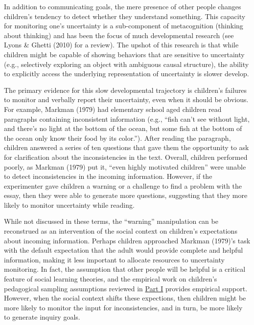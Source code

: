 \documentclass[oneside]{report}
\begin{document}
In addition to communicating goals, the mere presence of other people
changes children's tendency to detect whether they understand something.
This capacity for monitoring one's uncertainty is a sub-component of
metacognition (thinking about thinking) and has been the focus of much
developmental research (see Lyons \& Ghetti (2010) for a review). The
upshot of this research is that while children might be capable of
showing behaviors that are sensitive to uncertainty (e.g., selectively
exploring an object with ambiguous causal structure), the ability to
explicitly access the underlying representation of uncertainty is slower
develop.

The primary evidence for this slow developmental trajectory is
children's failures to monitor and verbally report their uncertainty,
even when it should be obvious. For example, Markman (1979) had
elementary school aged children read paragraphs containing inconsistent
information (e.g., ``fish can't see without light, and there's no light
at the bottom of the ocean, but some fish at the bottom of the ocean
only know their food by its color.''). After reading the paragraph,
children answered a series of ten questions that gave them the
opportunity to ask for clarification about the inconsistencies in the
text. Overall, children performed poorly, as Markman (1979) put it,
``even highly motivated children'' were unable to detect inconsistencies
in the incoming information. However, if the experimenter gave children
a warning or a challenge to find a problem with the essay, then they
were able to generate more questions, suggesting that they more likely
to monitor uncertainty while reading.

While not discussed in these terms, the ``warning'' manipulation can be
reconstrued as an intervention of the social context on children's
expectations about incoming information. Perhaps children approached
Markman (1979)'s task with the default expectation that the adult would
provide complete and helpful information, making it less important to
allocate resources to uncertainty monitoring. In fact, the assumption
that other people will be helpful is a critical feature of social
learning theories, and the empirical work on children's pedagogical
sampling assumptions reviewed in \protect\hyperlink{p1}{Part I} provides
empirical support. However, when the social context shifts these
expections, then children might be more likely to monitor the input for
inconsistencies, and in turn, be more likely to generate inquiry goals.
\end{document}
